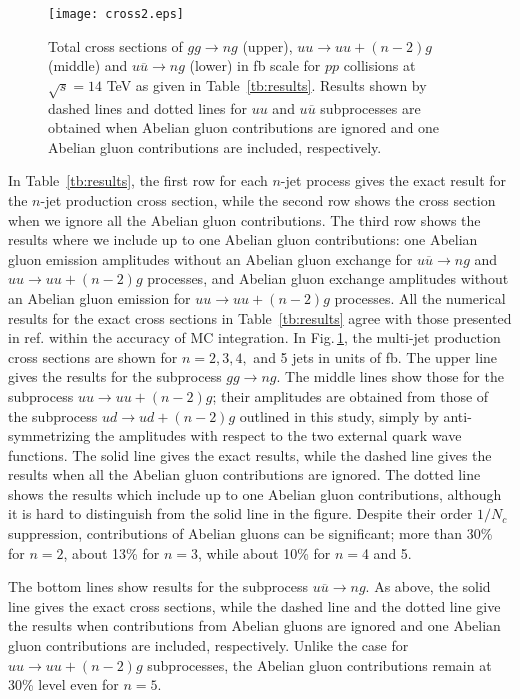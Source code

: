\documentclass[a4paper,11pt]{article}
\begin{document}
\begin{figure}
\begin{center}
\texttt{[image: cross2.eps]}
\caption{Total cross sections of $gg\rightarrow ng$ (upper),
 $uu\rightarrow uu+(n-2)g$ (middle) and
 $u\overline{u}\rightarrow ng$ (lower)
 in fb scale for $pp$ collisions at
 $\sqrt{s}=14$ TeV as given in Table~\ref{tb:results}.
 Results shown by dashed lines and dotted lines for $uu$ and $u\overline{u}$
 subprocesses are obtained when Abelian gluon contributions
 are ignored and one Abelian gluon contributions are included, respectively.}
\label{fig:results}
\end{center}
\end{figure}
In Table~\ref{tb:results}, the first row for each $n$-jet process gives the
 exact result for the $n$-jet production cross section, while the
 second row shows the cross section when we ignore all the Abelian
 gluon contributions. The third row shows the results where we include up to one Abelian
 gluon contributions: one Abelian gluon emission amplitudes without an
 Abelian gluon exchange for $u\overline{u}\rightarrow ng$ and $uu\rightarrow
 uu+(n-2)g$ processes, and Abelian gluon
 exchange amplitudes without an Abelian gluon emission for $uu\rightarrow
 uu+(n-2)g$ processes.
 All the numerical results for the exact cross
 sections in Table~\ref{tb:results}
 agree with those
 presented in ref.\cite{GPU2} within the accuracy of MC integration.
 In Fig.\,\ref{fig:results}, the multi-jet production cross sections
 are shown for $n=2, 3, 4,$ and 5 jets in units of fb.
 The upper line gives the results for the subprocess $gg\rightarrow ng$.
 The middle lines show those for the subprocess
 $uu\rightarrow uu+(n-2)g$; their amplitudes are obtained from those of
 the
 subprocess
 $ud\rightarrow ud+(n-2)g$ outlined in this study,
 simply by anti-symmetrizing the amplitudes with respect
 to the two external quark wave functions. The solid line gives the
 exact results, while the dashed line gives
 the results when all the Abelian gluon contributions are
 ignored. The dotted line shows the results which include up to one Abelian gluon
 contributions, although it is hard to distinguish from the solid line
 in the figure. Despite their order $1/N_c$ suppression, contributions of Abelian gluons can be significant;
 more than 30\% for $n=2$, about 13\% for $n=3$, while
 about 10\% for $n=$4 and 5.

 The bottom lines show results for the subprocess
 $u\overline{u}\rightarrow ng$. As above, the solid line gives
 the exact cross sections, while
 the dashed line and the dotted line give the results when contributions
 from Abelian gluons are ignored and one Abelian gluon contributions are
 included, respectively.
Unlike the case for $uu \to uu+(n-2)g$ subprocesses,
 the Abelian gluon contributions remain at 30\% level
 even for $n=5$.
\end{document}
